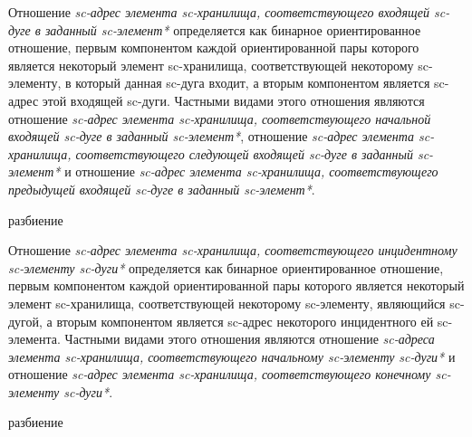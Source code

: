 Отношение \textit{sc-адрес элемента sc-хранилища, соответствующего входящей sc-дуге в заданный sc-элемент*} определяется как бинарное ориентированное отношение, первым компонентом каждой ориентированной пары которого является некоторый элемент sc-хранилища, соответствующей некоторому sc-элементу, в который данная sc-дуга входит, а вторым компонентом является sc-адрес этой входящей sc-дуги. Частными видами этого отношения являются отношение \textit{sc-адрес элемента sc-хранилища, соответствующего начальной входящей sc-дуге в заданный sc-элемент*}, отношение \textit{sc-адрес элемента sc-хранилища, соответствующего следующей входящей sc-дуге в заданный sc-элемент*} и отношение \textit{sc-адрес элемента sc-хранилища, соответствующего предыдущей входящей sc-дуге в заданный sc-элемент*}.

\begin{SCn}
\begin{scnrelfromset}{разбиение}
\end{scnrelfromset}
\end{SCn}

Отношение \textit{sc-адрес элемента sc-хранилища, соответствующего инцидентному sc-элементу sc-дуги*} определяется как бинарное ориентированное отношение, первым компонентом каждой ориентированной пары которого является некоторый элемент sc-хранилища, соответствующей некоторому sc-элементу, являющийся sc-дугой, а вторым компонентом является sc-адрес некоторого инцидентного ей sc-элемента. Частными видами этого отношения являются отношение \textit{sc-адреса элемента sc-хранилища, соответствующего начальному sc-элементу sc-дуги*} и отношение \textit{sc-адрес элемента sc-хранилища, соответствующего конечному sc-элементу sc-дуги*}.

\begin{SCn}
\begin{scnrelfromset}{разбиение}
\end{scnrelfromset}
\end{SCn}

